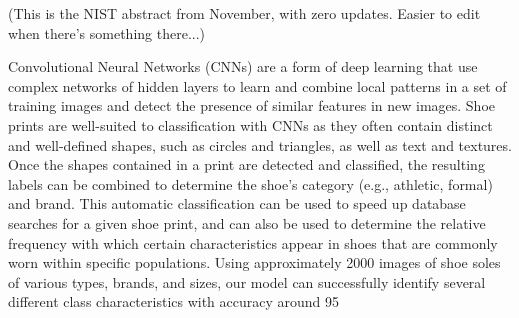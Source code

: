 
(This is the NIST abstract from November, with zero updates. Easier to edit when there's something there...)

	Convolutional Neural Networks (CNNs) are a form of deep learning that use complex networks of hidden layers to learn and combine local patterns in a set of training images and detect the presence of similar features in new images. Shoe prints are well-suited to classification with CNNs as they often contain distinct and well-defined shapes, such as circles and triangles, as well as text and textures. Once the shapes contained in a print are detected and classified, the resulting labels can be combined to determine the shoe’s category (e.g., athletic, formal) and brand. This automatic classification can be used to speed up database searches for a given shoe print, and can also be used to determine the relative frequency with which certain characteristics appear in shoes that are commonly worn within specific populations. Using approximately 2000 images of shoe soles of various types, brands, and sizes, our model can successfully identify several different class characteristics with accuracy around 95%

